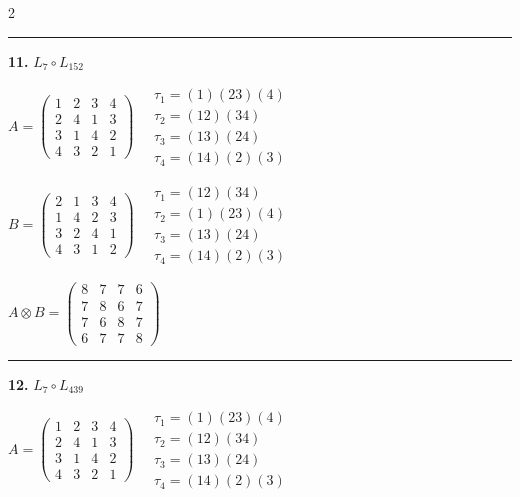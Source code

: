 \begin{multicols}{2}
\vspace{0.3em}
\hrule
\vspace{0.3em}

\noindent\textbf{11.} $L_{7} \circ L_{152}$

$A = \begin{pmatrix} 1 & 2 & 3 & 4 \\ 2 & 4 & 1 & 3 \\ 3 & 1 & 4 & 2 \\ 4 & 3 & 2 & 1 \end{pmatrix} \quad \begin{matrix} \tau_{1}=(1)(2 3)(4) \\ \tau_{2}=(1 2)(3 4) \\ \tau_{3}=(1 3)(2 4) \\ \tau_{4}=(1 4)(2)(3) \end{matrix}$

$B = \begin{pmatrix} 2 & 1 & 3 & 4 \\ 1 & 4 & 2 & 3 \\ 3 & 2 & 4 & 1 \\ 4 & 3 & 1 & 2 \end{pmatrix} \quad \begin{matrix} \tau_{1}=(1 2)(3 4) \\ \tau_{2}=(1)(2 3)(4) \\ \tau_{3}=(1 3)(2 4) \\ \tau_{4}=(1 4)(2)(3) \end{matrix}$

$A \otimes B = \begin{pmatrix} 8 & 7 & 7 & 6 \\ 7 & 8 & 6 & 7 \\ 7 & 6 & 8 & 7 \\ 6 & 7 & 7 & 8 \end{pmatrix}$

\vspace{0.3em}
\hrule
\vspace{0.3em}

\noindent\textbf{12.} $L_{7} \circ L_{439}$

$A = \begin{pmatrix} 1 & 2 & 3 & 4 \\ 2 & 4 & 1 & 3 \\ 3 & 1 & 4 & 2 \\ 4 & 3 & 2 & 1 \end{pmatrix} \quad \begin{matrix} \tau_{1}=(1)(2 3)(4) \\ \tau_{2}=(1 2)(3 4) \\ \tau_{3}=(1 3)(2 4) \\ \tau_{4}=(1 4)(2)(3) \end{matrix}$


\end{multicols}
